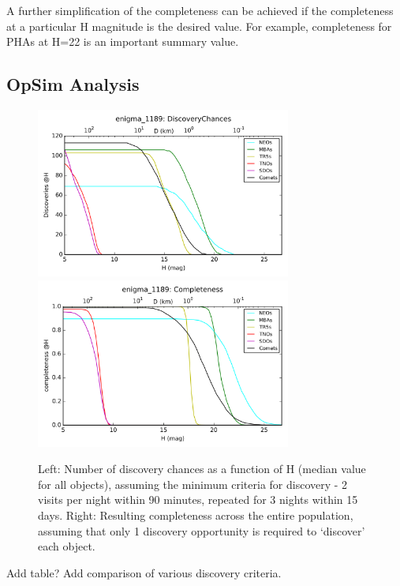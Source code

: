 A further simplification of the completeness can be achieved if the
completeness at a particular H magnitude is the desired value. For
example, completeness for PHAs at H=22 is an important summary value.


\subsection{OpSim Analysis}
\label{sec:\secname:analysis}


\begin{figure}
\includegraphics[width=3.3in]{figs/solarsystem/discoverychances}
\includegraphics[width=3.3in]{figs/solarsystem/completeness}
\caption{Left: Number of discovery chances as a function of H
  (median value for all objects), assuming the minimum criteria for
  discovery - 2 visits per night within 90 minutes, repeated for 3
  nights within 15 days. Right: Resulting completeness across the
  entire population, assuming that only 1 discovery opportunity is
  required to `discover' each object. 
\label{standard_discovery}}
\end{figure}

Add table? Add comparison of various discovery criteria.



